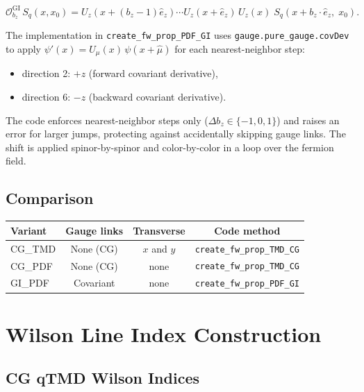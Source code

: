 \documentclass[11pt,a4paper]{article}
\newcommand{\ehat}[1]{\hat{e}_{#1}}
\begin{document}
\begin{equation}
  \mathcal{O}_{b_z}^{\text{GI}}\, S_q(x, x_0) =
    U_z(x + (b_z-1)\ehat{z}) \cdots U_z(x + \ehat{z})\, U_z(x)\;
    S_q(x + b_z \cdot \ehat{z},\; x_0).
\end{equation}

The implementation in \texttt{create\_fw\_prop\_PDF\_GI} uses
\texttt{gauge.pure\_gauge.covDev} to apply $\psi'(x) = U_\mu(x)\, \psi(x + \hat{\mu})$
for each nearest-neighbor step:
\begin{itemize}
  \item direction 2: $+z$ (forward covariant derivative),
  \item direction 6: $-z$ (backward covariant derivative).
\end{itemize}

The code enforces nearest-neighbor steps only ($\Delta b_z \in \{-1, 0, 1\}$) and
raises an error for larger jumps, protecting against accidentally skipping gauge
links. The shift is applied spinor-by-spinor and color-by-color in a loop over the
fermion field.

\subsection{Comparison}

\begin{center}
  \begin{tabular}{l|c|c|c}
    Variant & Gauge links & Transverse & Code method \\
    \hline
    CG\_TMD & None (CG) & $x$ and $y$ & \texttt{create\_fw\_prop\_TMD\_CG} \\
    CG\_PDF & None (CG) & none & \texttt{create\_fw\_prop\_TMD\_CG} \\
    GI\_PDF & Covariant & none & \texttt{create\_fw\_prop\_PDF\_GI}
  \end{tabular}
\end{center}

\section{Wilson Line Index Construction}
\label{sec:wilson}

\subsection{CG qTMD Wilson Indices}
\end{document}
